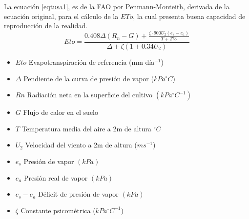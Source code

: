 La ecuación \eqref{eqtusa1}, es de la FAO  por Penmann-Monteith, derivada de la ecuación original, para el cálculo de la $ETo$, la cual presenta buena capacidad de reproducción de la realidad.
\begin{equation}
\label{eqtusa1}
    Eto = \frac{0.408\Delta\left(R_n - G\right) +\frac{\zeta \cdot 900U_2\left(e_s - e_a\right)}{T + 273}}{\Delta +\zeta\left(1 + 0.34U_2\right)}
\end{equation}
\begin{notation}
    \begin{itemize}
        \item $Eto$ Evapotranspiración de referencia (mm día$^{-1}$)
        \item $\Delta$ Pendiente de la curva de presión de vapor ($kPa^{\circ}C$)
        \item $Rn$ Radiación neta en la superficie del cultivo $(kPa^{\circ}C^{-1})$
        \item $G$ Flujo de calor en el suelo
        \item $T$ Temperatura media del aire a 2m de altura $^{\circ}C$
        \item $U_2$ Velocidad del viento a 2m de altura ($m s^{-1}$)
        \item $e_s$ Presión de vapor $(kPa)$
        \item $e_a$ Presión real de vapor $(kPa)$
        \item $e_s-e_a$ Déficit de presión de vapor $(kPa)$
        \item $\zeta$ Constante psicométrica ($kPa^{\circ}C^{-1}$)
    \end{itemize}
\end{notation}

